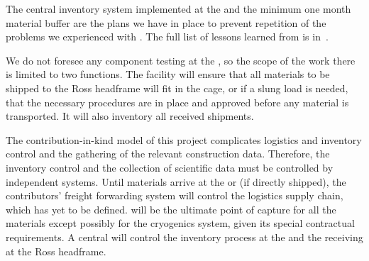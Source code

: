 The central inventory system  implemented at the   and the minimum one month material buffer are the plans we have in place to prevent repetition of the problems we experienced with .   The full list of lessons learned from  is in~\cite{bib:docdb8255}. 

We do not foresee any component testing at the , %
so the scope of the  work there is limited to two functions. %
The facility will ensure that all materials to be shipped to the Ross headframe will fit in the cage, or %
if a slung load is needed, %
that the necessary procedures are in place and approved before any material is transported. %
It will also %
inventory all received shipments. %


The contribution-in-kind model of this project complicates logistics and inventory control and the gathering of the relevant construction data. Therefore, the inventory control and the collection of scientific data 
 must be controlled by independent systems. 
Until materials arrive at the  or  (if directly shipped), the contributors' freight forwarding system will control the logistics supply chain, which has yet to be defined.   will be the ultimate point of capture for all the materials except possibly for the cryogenics system, given its special contractual requirements. A central  will control the inventory process at the  and the  receiving at the Ross headframe. 

